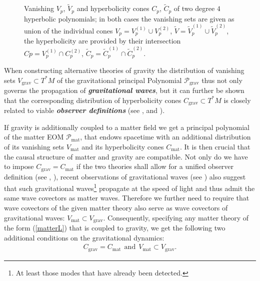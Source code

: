 \documentclass[%
 reprint,
nofootinbib,
 amsmath,amssymb,
 aps,
 prd,
floatfix,
]{revtex4-2}
\newcommand{\coneback}[4][]{
  \draw[canvas is xy plane at z=#2, #1] (45-#4:#3) arc (45-#4:225+#4:#3) -- (O) --cycle;
  }
\newcommand{\conefront}[4][]{
  \draw[canvas is xy plane at z=#2, #1] (45-#4:#3) arc (45-#4:-135+#4:#3) -- (O) --cycle;
  }
\begin{document}
\begin{figure}
\begin{minipage}{0.2\textwidth}
\begin{center}
\end{center}
\end{minipage}
    \caption{Vanishing $V_p$, $\widetilde{V}_p$ and hyperbolicity cones $C_p$, $\widetilde{C}_p$ of two degree $4$ hyperbolic polynomials; in both cases the vanishing sets are given as union of the individual cones $V_p = V_p^{(1)} \cup V_p^{(2)}$, $\widetilde{V} = \widetilde{V}_p^{(1)} \cup \widetilde{V}_p^{(2)}$, the hyperbolicity are provided by their intersection $Cp = V_p^{(1)} \cap C_p^{(2)}$,  $\widetilde{C}_p = \widetilde{C}_p^{(1)} \cap \widetilde{C}_p^{(2)}$.}
    \label{Poly}
\end{figure}

When constructing alternative theories of gravity the distribution of vanishing sets $V_{\text{grav}} \subset T^{\ast}M$ of the gravitational principal Polynomial $\mathcal{P}_{\text{grav}}$ thus not only governs the propagation of \textit{\textbf{gravitational waves}}, but it can further be shown that the corresponding distribution of hyperbolicity cones $C_{\text{grav}}\subset T^{\ast}M$ is closely related to viable \textit{\textbf{observer definitions}} (see \cite{2018PhRvD..97h4036D}, \cite{2011PhRvD..83d4047R} and \cite{Rivera}). 

If gravity is additionally coupled to a matter field we get a principal polynomial of the matter EOM $\mathcal{P}_{\text{mat}}$, that endows spacetime with an additional distribution of its vanishing sets $V_{\text{mat}}$ and its hyperbolicity cones $C_{\text{mat}}$. It is then crucial that the causal structure of matter and gravity are compatible. 
Not only do we have to impose $C_{\text{grav}} = C_{\text{mat}}$ if the two theories shall allow for a unified observer definition (see \cite{Rivera}, \cite{2011PhRvD..83d4047R}), recent observations of gravitational waves (see \cite{2017ApJ...848L..13A}) also suggest that such gravitational waves\footnote{At least those modes that have already been detected.} propagate at the speed of light and thus admit the same wave covectors as matter waves.
Therefore we further need to require that wave covectors of the given matter theory also serve as wave covectors of gravitational waves: $V_{\text{mat}} \subset V_{\text{grav}}$.
Consequently, specifying any matter theory of the form (\ref{matterL}) that is coupled to gravity, we get the following two additional conditions on the gravitational dynamics:
\begin{align}\label{A2}
    C_{\text{grav}} = C_{\text{mat}} \ \ \text{and} \ \ V_{\text{mat}} \subset V_{\text{grav}}.\tag{Axiom 2}
\end{align}
\end{document}
